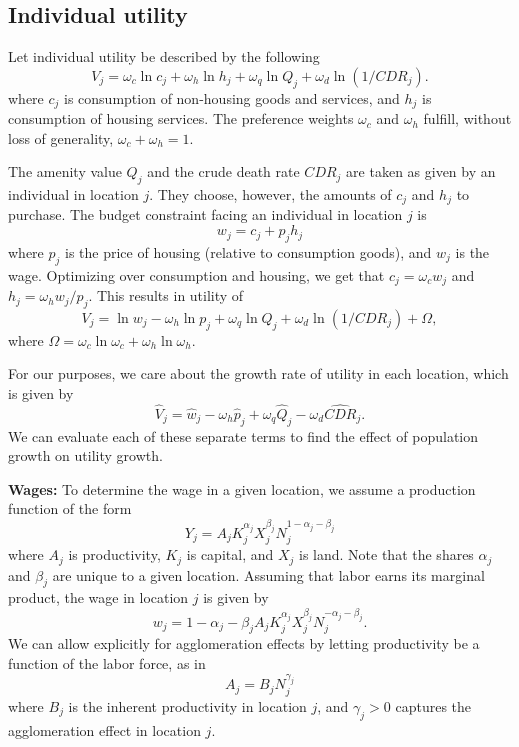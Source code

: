\documentclass[10pt]{article}
\begin{document}
\onehalfspacing 

\subsection{Individual utility}
Let individual utility be described by the following
\begin{equation}
    V_j = \omega_c \ln c_j + \omega_h \ln h_j + \omega_q \ln Q_j + \omega_d \ln (1/CDR_j).
\end{equation}
where $c_j$ is consumption of non-housing goods and services, and $h_j$ is consumption of housing services. The preference weights $\omega_c$ and $\omega_h$ fulfill, without loss of generality, $\omega_c + \omega_h = 1$. 

The amenity value $Q_j$ and the crude death rate $CDR_j$ are taken as given by an individual in location $j$. They choose, however, the amounts of $c_j$ and $h_j$ to purchase.  The budget constraint facing an individual in location $j$ is
\begin{equation}
    w_j = c_j + p_j h_j
\end{equation}
where $p_j$ is the price of housing (relative to consumption goods), and $w_j$ is the wage. Optimizing over consumption and housing, we get that $c_j = \omega_c w_j$ and $h_j = \omega_h w_j/p_j$. This results in utility of
\begin{equation}
    V_j = \ln w_j - \omega_h \ln p_j + \omega_q \ln Q_j + \omega_d \ln (1/CDR_j) + \Omega,
\end{equation}
where $\Omega = \omega_c \ln \omega_c + \omega_h \ln \omega_h$. 

For our purposes, we care about the growth rate of utility in each location, which is given by
\begin{equation}
    \hat{V}_j = \hat{w}_j - \omega_h \hat{p}_j + \omega_q \hat{Q}_j - \omega_d \hat{CDR}_j.
\end{equation}
We can evaluate each of these separate terms to find the effect of population growth on utility growth.

\textbf{Wages:} To determine the wage in a given location, we assume a production function of the form
\begin{equation}
    Y_j = A_j K_j^{\alpha_j} X_j^{\beta_j} N_j^{1 - \alpha_j - \beta_j}
\end{equation}
where $A_j$ is productivity, $K_j$ is capital, and $X_j$ is land. Note that the shares $\alpha_j$ and $\beta_j$ are unique to a given location. Assuming that labor earns its marginal product, the wage in location $j$ is given by
\begin{equation}
    w_j = {1 - \alpha_j - \beta_j} A_j K_j^{\alpha_j} X_j^{\beta_j} N_j^{- \alpha_j - \beta_j}.
\end{equation}
We can allow explicitly for agglomeration effects by letting productivity be a function of the labor force, as in
\begin{equation}
    A_j = B_j N_j^{\gamma_j}
\end{equation}
where $B_j$ is the inherent productivity in location $j$, and $\gamma_j>0$ captures the agglomeration effect in location $j$. 
\end{document}
